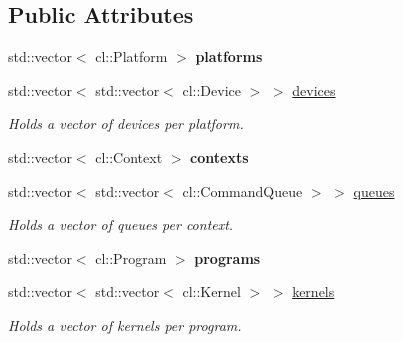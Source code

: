 \subsection*{Public Attributes}
\begin{DoxyCompactItemize}
\item 
\hypertarget{classclutils_1_1CLEnv_af953f5e94ebba268f7118f9316d371b4}{}std\+::vector$<$ cl\+::\+Platform $>$ {\bfseries platforms}\label{classclutils_1_1CLEnv_af953f5e94ebba268f7118f9316d371b4}

\item 
\hypertarget{classclutils_1_1CLEnv_a39ace0c346123dda3968a4199fa92b4d}{}std\+::vector$<$ std\+::vector$<$ cl\+::\+Device $>$ $>$ \hyperlink{classclutils_1_1CLEnv_a39ace0c346123dda3968a4199fa92b4d}{devices}\label{classclutils_1_1CLEnv_a39ace0c346123dda3968a4199fa92b4d}

\begin{DoxyCompactList}\small\item\em Holds a vector of devices per platform. \end{DoxyCompactList}\item 
\hypertarget{classclutils_1_1CLEnv_a4e85a17a865041fa67b28dc28f981263}{}std\+::vector$<$ cl\+::\+Context $>$ {\bfseries contexts}\label{classclutils_1_1CLEnv_a4e85a17a865041fa67b28dc28f981263}

\item 
\hypertarget{classclutils_1_1CLEnv_a15687c9c11699256fa5994310c017938}{}std\+::vector$<$ std\+::vector$<$ cl\+::\+Command\+Queue $>$ $>$ \hyperlink{classclutils_1_1CLEnv_a15687c9c11699256fa5994310c017938}{queues}\label{classclutils_1_1CLEnv_a15687c9c11699256fa5994310c017938}

\begin{DoxyCompactList}\small\item\em Holds a vector of queues per context. \end{DoxyCompactList}\item 
\hypertarget{classclutils_1_1CLEnv_ac7f5712102c9b10f259697712ecd08c3}{}std\+::vector$<$ cl\+::\+Program $>$ {\bfseries programs}\label{classclutils_1_1CLEnv_ac7f5712102c9b10f259697712ecd08c3}

\item 
\hypertarget{classclutils_1_1CLEnv_a50c76733a023493150ac2844d544513b}{}std\+::vector$<$ std\+::vector$<$ cl\+::\+Kernel $>$ $>$ \hyperlink{classclutils_1_1CLEnv_a50c76733a023493150ac2844d544513b}{kernels}\label{classclutils_1_1CLEnv_a50c76733a023493150ac2844d544513b}

\begin{DoxyCompactList}\small\item\em Holds a vector of kernels per program. \end{DoxyCompactList}\end{DoxyCompactItemize}


